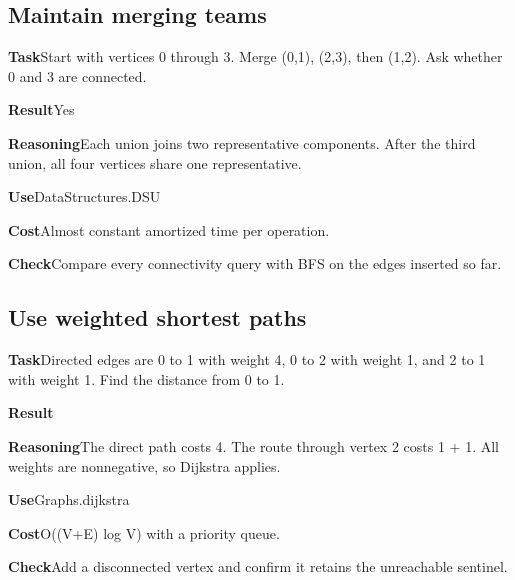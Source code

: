 \documentclass[10pt,letterpaper]{article}
\newcommand{\entrylabel}[1]{\textcolor{accent}{\bfseries #1}}
\begin{document}
\subsection*{Maintain merging teams}
\noindent\entrylabel{Task}\quad Start with vertices 0 through 3. Merge (0,1), (2,3), then (1,2). Ask whether 0 and 3 are connected.\par
\noindent\entrylabel{Result}\quad Yes\par
\noindent\entrylabel{Reasoning}\quad Each union joins two representative components. After the third union, all four vertices share one representative.\par
\noindent\entrylabel{Use}\quad DataStructures.DSU\par
\noindent\entrylabel{Cost}\quad Almost constant amortized time per operation.\par
\noindent\entrylabel{Check}\quad Compare every connectivity query with BFS on the edges inserted so far.\par
\subsection*{Use weighted shortest paths}
\noindent\entrylabel{Task}\quad Directed edges are 0 to 1 with weight 4, 0 to 2 with weight 1, and 2 to 1 with weight 1. Find the distance from 0 to 1.\par
\noindent\entrylabel{Result}\par
\noindent\entrylabel{Reasoning}\quad The direct path costs 4. The route through vertex 2 costs 1 + 1. All weights are nonnegative, so Dijkstra applies.\par
\noindent\entrylabel{Use}\quad Graphs.dijkstra\par
\noindent\entrylabel{Cost}\quad O((V+E) log V) with a priority queue.\par
\noindent\entrylabel{Check}\quad Add a disconnected vertex and confirm it retains the unreachable sentinel.\par
\end{document}
